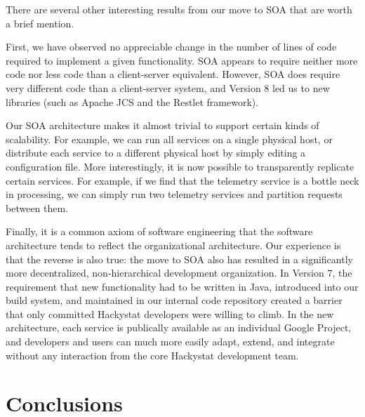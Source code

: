 \documentclass[conference,compsoc,peerreview]{IEEEtran}
\begin{document}
There are several other interesting results from our move to SOA that are
worth a brief mention.

First, we have observed no appreciable change in the number of lines of
code required to implement a given functionality.  SOA appears to require
neither more code nor less code than a client-server equivalent.  However,
SOA does require very different code than a client-server system, and
Version 8 led us to new libraries (such as Apache JCS and the Restlet
framework).

Our SOA architecture makes it almost trivial to support certain kinds of
scalability.  For example, we can run all services on a single physical
host, or distribute each service to a different physical host by simply
editing a configuration file.  More interestingly, it is now possible to
transparently replicate certain services.  For example, if we find that the
telemetry service is a bottle neck in processing, we can simply run two
telemetry services and partition requests between them.

Finally, it is a common axiom of software engineering that the software
architecture tends to reflect the organizational architecture.  Our
experience is that the reverse is also true: the move to SOA also has
resulted in a significantly more decentralized, non-hierarchical
development organization.  In Version 7, the requirement that new
functionality had to be written in Java, introduced into our build system,
and maintained in our internal code repository created a barrier that only
committed Hackystat developers were willing to climb.  In the new
architecture, each service is publically available as an individual Google
Project, and developers and users can much more easily adapt, extend, and
integrate without any interaction from the core Hackystat development team.

\section{Conclusions}
\label{sec:conclusion}
\end{document}
